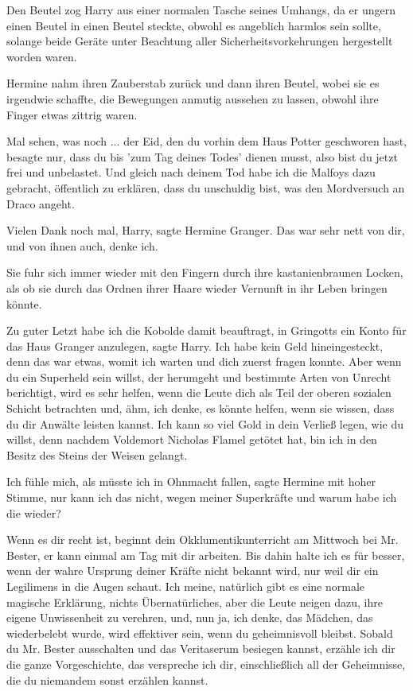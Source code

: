Den Beutel zog Harry aus einer normalen Tasche seines Umhangs, da er ungern
einen Beutel in einen Beutel steckte, obwohl es angeblich harmlos sein sollte,
solange beide Geräte unter Beachtung aller Sicherheitsvorkehrungen hergestellt
worden waren.

Hermine nahm ihren Zauberstab zurück und dann ihren Beutel, wobei sie es
irgendwie schaffte, die Bewegungen anmutig aussehen zu lassen, obwohl ihre
Finger etwas zittrig waren.

\glqq{}Mal sehen, was noch ... der Eid, den du vorhin dem Haus Potter geschworen
hast, besagte nur, dass du bis 'zum Tag deines Todes' dienen musst, also bist du
jetzt frei und unbelastet. Und gleich nach deinem Tod habe ich die Malfoys dazu
gebracht, öffentlich zu erklären, dass du unschuldig bist, was den Mordversuch
an Draco angeht.\grqq{}

\glqq{}Vielen Dank noch mal, Harry\grqq{}, sagte Hermine Granger. \glqq{}Das war
sehr nett von dir, und von ihnen auch, denke ich.\grqq{}

Sie fuhr sich immer wieder mit den Fingern durch ihre kastanienbraunen Locken,
als ob sie durch das Ordnen ihrer Haare wieder Vernunft in ihr Leben bringen
könnte.

\glqq{}Zu guter Letzt habe ich die Kobolde damit beauftragt, in Gringotts ein
Konto für das Haus Granger anzulegen\grqq{}, sagte Harry. \glqq{}Ich habe kein
Geld hineingesteckt, denn das war etwas, womit ich warten und dich zuerst fragen
konnte. Aber wenn du ein Superheld sein willst, der herumgeht und bestimmte
Arten von Unrecht berichtigt, wird es sehr helfen, wenn die Leute dich als Teil
der oberen sozialen Schicht betrachten und, ähm, ich denke, es könnte helfen,
wenn sie wissen, dass du dir Anwälte leisten kannst. Ich kann so viel Gold in
dein Verließ legen, wie du willst, denn nachdem Voldemort Nicholas Flamel
getötet hat, bin ich in den Besitz des Steins der Weisen gelangt.\grqq{}

\glqq{}Ich fühle mich, als müsste ich in Ohnmacht fallen\grqq{}, sagte Hermine
mit hoher Stimme, \glqq{}nur kann ich das nicht, wegen meiner Superkräfte und
warum habe ich die wieder?\grqq{}

\glqq{}Wenn es dir recht ist, beginnt dein Okklumentikunterricht am Mittwoch bei
Mr. Bester, er kann einmal am Tag mit dir arbeiten. Bis dahin halte ich es für
besser, wenn der wahre Ursprung deiner Kräfte nicht bekannt wird, nur weil dir
ein Legilimens in die Augen schaut. Ich meine, natürlich gibt es eine normale
magische Erklärung, nichts Übernatürliches, aber die Leute neigen dazu, ihre
eigene Unwissenheit zu verehren, und, nun ja, ich denke, das Mädchen, das
wiederbelebt wurde, wird effektiver sein, wenn du geheimnisvoll bleibst. Sobald
du Mr. Bester ausschalten und das Veritaserum besiegen kannst, erzähle ich dir
die ganze Vorgeschichte, das verspreche ich dir, einschließlich all der
Geheimnisse, die du niemandem sonst erzählen kannst.\grqq{}

